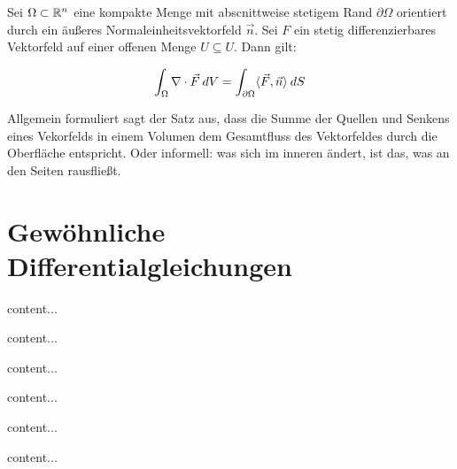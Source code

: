 \begin{satz}
	Sei $\Omega \subset \mathbb{R}^n$ eine kompakte Menge mit abscnittweise stetigem Rand $\partial \Omega$ orientiert durch ein äußeres Normaleinheitsvektorfeld $\vec{n}$. Sei $F$ ein stetig differenzierbares Vektorfeld auf einer offenen Menge $U \subseteq U$. Dann gilt:
	
	\begin{align*}
		\int_\Omega \nabla \cdot \vec{F} \medspace dV = \int_{\partial \Omega} \langle \vec{F}, \vec{n} \rangle \medspace dS
	\end{align*}
	
	Allgemein formuliert sagt der Satz aus, dass die Summe der Quellen und Senkens eines Vekorfelds in einem Volumen dem Gesamtfluss des Vektorfeldes durch die Oberfläche entspricht.
	Oder informell: was sich im inneren ändert, ist das, was an den Seiten rausfließt.	
	
\end{satz}

\begin{satz}
	
\end{satz}

\pagebreak

\section{Gewöhnliche Differentialgleichungen}

\begin{definition}[Gebiet]
	content...
\end{definition}

\begin{definition}
	content...
\end{definition}

\begin{satz}
	content...
\end{satz}

\begin{definition}
	content...
\end{definition}

\begin{satz}
	content...
\end{satz}

\begin{satz}
	content...
\end{satz}

